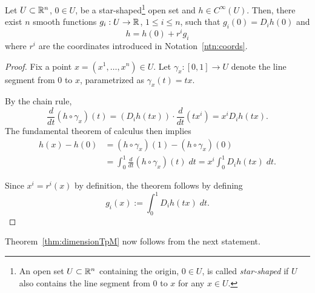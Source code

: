 \begin{lemma}\label{lem:Taylor}
  Let $U\subset\mathbb{R}^n$, $0\in U$, be a star-shaped\footnote{An open set $U\subset\mathbb{R}^n$ containing the origin, $0\in U$, is called \emph{star-shaped} if $U$ also contains the line segment from $0$ to $x$ for any $x\in U$.} open set and $h\in C^\infty(U)$.
  Then, there exist $n$ smooth functions $g_i: U \to \mathbb{R}$, $1\leq i \leq n$, such that $g_i(0) = D_i h(0)$ and
  \begin{equation}
    h = h(0) + r^i g_i
  \end{equation}
  where $r^i$ are the coordinates introduced in Notation~\ref{ntn:coords}.
\end{lemma}
\begin{proof}
  Fix a point $x = (x^1, \ldots, x^n) \in U$.
  Let $\gamma_x:[0,1]\to U$ denote the line segment from $0$ to $x$, parametrized as $\gamma_x(t) = tx$.

  By the chain rule,
  \begin{equation}
    \frac{d}{dt}(h \circ \gamma_x) (t) = \left(D_i h(t x)\right) \cdot \frac{d}{dt} (t x^i) = x^i D_i h(t x).
  \end{equation}
  The fundamental theorem of calculus then implies
  \begin{align}
    h(x) - h(0) & = (h \circ \gamma_x)(1) - (h \circ \gamma_x)(0)                                 \\
                & = \int_0^1 \frac{d}{dt}(h \circ \gamma_x)(t)\;dt = x^i \int_0^1 D_i h(tx)\; dt.
  \end{align}

  Since $x^i = r^i(x)$ by definition, the theorem follows by defining
  \begin{equation}
    g_i(x) := \int_0^1 D_i h(tx)\; dt.
  \end{equation}
\end{proof}

Theorem~\ref{thm:dimensionTpM} now follows from the next statement.


